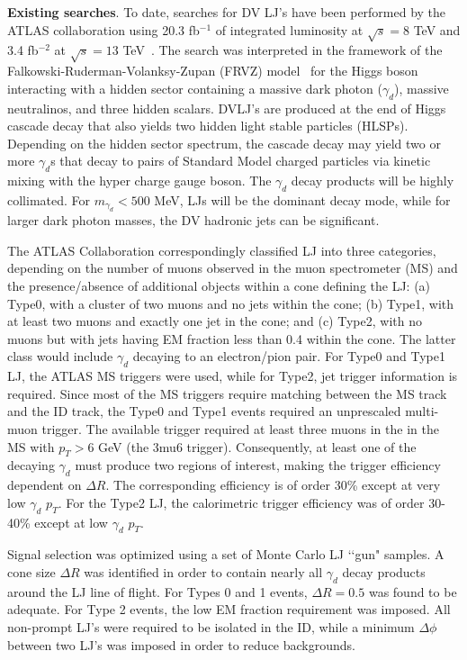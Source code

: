 {\bf Existing searches}. To date, searches for DV LJ's have been performed by the ATLAS collaboration using 20.3 fb$^{-1}$ of integrated luminosity at $\sqrt{s}=8$ TeV \cite{Aad:2014yea} and 3.4 fb$^{-2}$ at  $\sqrt{s}=13$ TeV~\cite{ATLAS:2016jza}. The search was interpreted in the framework of the Falkowski-Ruderman-Volanksy-Zupan (FRVZ) model~\cite{Falkowski:2010cm} for the Higgs boson interacting with a hidden sector containing a massive dark photon ($\gamma_d$), massive neutralinos, and three hidden scalars. DVLJ's are produced at the end of Higgs cascade decay that also yields two hidden light stable particles (HLSPs). Depending on the hidden sector spectrum, the cascade decay may yield two or more $\gamma_d$s that decay to pairs of Standard Model charged particles via kinetic mixing with the hyper charge gauge boson. The $\gamma_d$ decay products will be highly collimated. For $m_{\gamma_d} < 500$ MeV, LJs will be the dominant decay mode, while for larger dark photon masses, the DV hadronic jets can be significant.

The ATLAS Collaboration correspondingly classified LJ into three categories, depending on the number of muons observed in the muon spectrometer (MS) and the presence/absence of additional objects within a cone defining the LJ: (a) Type0, with a cluster of two muons and no jets within the cone; (b) Type1, with at least two muons and exactly one jet in the cone; and (c) Type2, with no muons but with jets having EM fraction less than 0.4 within the cone. The latter class would include $\gamma_d$ decaying to an electron/pion pair. For Type0 and Type1 LJ,  the ATLAS MS triggers were used, while for Type2, jet trigger information is required. Since most of the MS triggers require matching between the MS track and the ID track, the Type0 and Type1 events required an unprescaled multi-muon trigger. The available trigger required at least three muons in the in the MS with $p_T> 6$ GeV (the 3mu6 trigger). Consequently, at least one of the decaying $\gamma_d$ must produce two regions of interest, making the trigger efficiency dependent on $\Delta R$. The corresponding efficiency is of order 30\% except at very low $\gamma_d$ $p_T$. For the Type2 LJ, the calorimetric trigger efficiency was of order 30-40\% except at low $\gamma_d$ $p_T$.

Signal selection was optimized using a set of Monte Carlo LJ \lq\lq gun" samples. A cone size $\Delta R$ was identified in order to contain nearly all $\gamma_d$ decay products around the LJ line of flight. For Types 0 and 1 events, $\Delta R=0.5$ was found to be adequate. For Type 2 events, the low EM fraction requirement was imposed. All non-prompt LJ's were required to be isolated in the ID, while a minimum $\Delta\phi$ between two LJ's was imposed in order to reduce backgrounds. 

